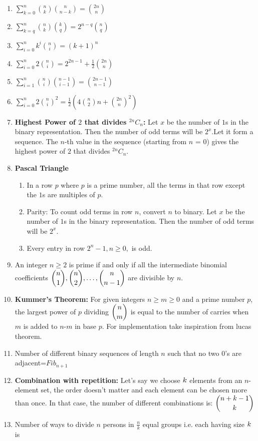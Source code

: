 \begin{enumerate}
\item $\displaystyle \sum \limits_{k=0}^n{\binom{n}{k}}{\binom{n}{n-k}}={\binom{2n}{n}}$
\item $\displaystyle \sum \limits_{k=q}^n{\binom{n}{k}}{\binom{k}{q}}=2^{n-q}{\binom{n}{q}}$
\item $\displaystyle \sum \limits_{i=0}^nk^i{\binom{n}{i}}=(k+1)^n$
\item $\displaystyle \sum \limits_{i=0}^n{2\binom{n}{i}}=2^{2n-1}+\frac{1}{2}{\binom{2n}{n}}$
\item $\displaystyle \sum \limits_{i=1}^n{\binom{n}{i}}{\binom{n-1}{i-1}}={\binom{2n-1}{n-1}}$
\item $\displaystyle \sum \limits_{i=0}^n{2\binom{n}{i}}^2=\frac{1}{2} \left( {4\binom{n}{2}n}+{\binom{2n}{n}}^2 \right)$
\item \textbf{Highest Power of $\displaystyle 2$ that divides $^{2n}C_n$:}
    Let $\displaystyle x$ be the number of $\displaystyle 1$s in the binary representation. Then the number of odd terms will be $\displaystyle 2^x$.Let it form a sequence. The $n$-th value in the sequence (starting from $n$ = 0) gives the highest power of $\displaystyle 2$ that divides $^{2n}C_n$.
\item \textbf{Pascal Triangle}
    \begin{enumerate}
        \item In a row $\displaystyle p$ where $\displaystyle p$ is a prime number, all the terms in that row except the $\displaystyle 1$s are multiples of $\displaystyle p$.
        \item Parity: To count odd terms in row $n$, convert $n$ to binary. Let $\displaystyle x$ be the number of $\displaystyle 1$s in the binary representation. Then the number of odd terms will be $\displaystyle 2^x$.
        \item Every entry in row $\displaystyle 2^n-1, n\geq 0,$ is odd.
    \end{enumerate}
\item An integer $n\geq 2$ is prime if and only if all the intermediate binomial coefficients $\displaystyle \displaystyle {\binom{n}{1}},{\binom{n}{2}}, \ldots, {\binom{n}{n-1}}$ are divisible by $n$. 
\item \textbf{Kummer's Theorem:} For given integers $n\geq m\geq 0$ and a prime number $\displaystyle p$, the largest power of $\displaystyle p$ dividing $\displaystyle \displaystyle {\binom{n}{m}}$  is equal to the number of carries when $m$ is added to $n$-$m$ in base $\displaystyle p$. For implementation take inspiration from lucas theorem.
\item Number of different binary sequences of length $n$ such that no two $0$'s are adjacent=$\displaystyle Fib_{n+1}$
\item \textbf{Combination with repetition:} Let's say we choose $\displaystyle \displaystyle k$ elements from an $n$-element set, the order doesn't matter and each element can be chosen more than once. In that case, the number of different combinations is: $\displaystyle \displaystyle {\binom{n+k-1}{k}}$
\item Number of ways to divide $n$ persons in $\displaystyle \frac{n}{k}$ equal groups i.e. each having size $\displaystyle \displaystyle k$ is 
    

\end{enumerate}
